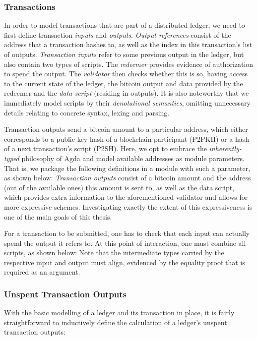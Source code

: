 \documentclass[acmsmall,nonacm=true,screen=true]{acmart}
\begin{document}
\subsubsection{Transactions}
In order to model transactions that are part of a distributed ledger, we need to first define
transaction \textit{inputs} and \textit{outputs}.
\UTXOinsOutRefs{}
\textit{Output references} consist of the address that a transaction hashes to, 
as well as the index in this transaction's list of outputs.
\textit{Transaction inputs} refer to some previous output in the ledger, but also contain two types of scripts.
The \textit{redeemer} provides evidence of authorization to spend the output.
The \textit{validator} then checks whether this is so, having access to the current state of the ledger, the bitcoin output
and data provided by the redeemer and the \textit{data script} (residing in outputs).
It is also noteworthy that we immediately model scripts by their \textit{denotational semantics},
omitting unnecessary details relating to concrete syntax, lexing and parsing.

Transaction outputs send a bitcoin amount to a particular address, which either corresponds to a public key hash of a
blockchain participant (P2PKH) or a hash of a next transaction's script (P2SH).
Here, we opt to embrace the \textit{inherently-typed} philosophy of Agda and model available addresses as module parameters.
That is, we package the following definitions in a module with such a parameter, as shown below:
\UTXOoutTxA{}
\UTXOoutTxB{}
\textit{Transaction outputs} consist of a bitcoin amount and the address (out of the available ones) this amount is sent to,
as well as the data script, which provides extra information to the aforementioned validator and allows for more expressive schemes.
Investigating exactly the extent of this expressiveness is one of the main goals of this thesis.

For a transaction to be submitted, one has to check that each input can actually spend the output it refers to.
At this point of interaction, one must combine all scripts, as shown below:
\UTXOrunValidation{}
Note that the intermediate types carried by the respective input and output must align, evidenced by the
equality proof that is required as an argument.

\subsubsection{Unspent Τransaction Οutputs}
With the basic modelling of a ledger and its transaction in place, it is fairly straightforward to 
inductively define the calculation of a ledger's unspent transaction outputs:
\UTXOutxo{}
\end{document}

